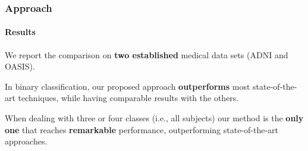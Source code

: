 \begin{frame}
	\frametitle{Approach}
	\framesubtitle{Results}
	
	\Large
	
	\vspace{0.2cm}
	
	We report the comparison on \textbf{two established} medical data sets (ADNI and OASIS).
	
	\vspace{0.5cm}
	
	In binary classification, our proposed approach \textbf{outperforms} most state-of-the-art
	techniques, while having comparable results with the others.
	
	\vspace{0.5cm}
	
	When dealing with three or four classes (i.e., all subjects) our method is the \textbf{only one}
	that reaches \textbf{remarkable} performance, outperforming state-of-the-art approaches.
\end{frame}
